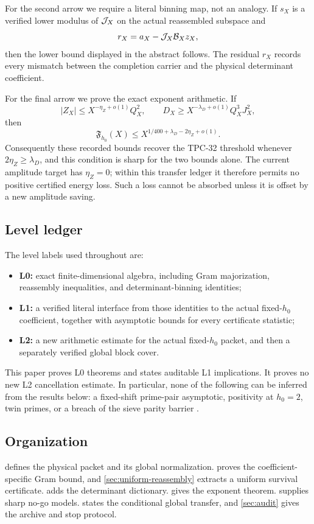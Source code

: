 For the second arrow we require a literal binning map, not an
analogy.  If \(s_X\) is a verified lower modulus of \(\mathcal J_X\) on the
actual reassembled subspace and
\[
 r_X=a_X-\mathcal J_X\mathcal B_Xz_X,
\]
then the lower bound displayed in the abstract follows.  The residual
\(r_X\) records every mismatch between the completion carrier and the
physical determinant coefficient.

For the final arrow we prove the exact exponent arithmetic.  If
\begin{equation}
 |Z_X|\le X^{-\eta_Z+o(1)}Q_X^2,
 \qquad
 D_X\ge X^{-\lambda_D+o(1)}Q_X^3J_X^2,
 \label{eq:intro-exponents}
\end{equation}
then
\begin{equation}
 \mathfrak F_{h_0}(X)
 \le
 X^{1/400+\lambda_D-2\eta_Z+o(1)}.
 \label{eq:intro-exponent-transfer}
\end{equation}
Consequently these recorded bounds recover the TPC-32 threshold
whenever \(2\eta_Z\ge\lambda_D\), and this condition is sharp for the
two bounds alone.  The current amplitude target has \(\eta_Z=0\);
within this transfer ledger it therefore permits no positive
certified energy loss.  Such a loss cannot be absorbed unless it is
offset by a new amplitude saving.

\subsection{Level ledger}

The level labels used throughout are:
\begin{itemize}[leftmargin=2em]
\item \textbf{L0:} exact finite-dimensional algebra, including Gram
majorization, reassembly inequalities, and determinant-binning
identities;
\item \textbf{L1:} a verified literal interface from those identities
to the actual fixed-\(h_0\) coefficient, together with asymptotic
bounds for every certificate statistic;
\item \textbf{L2:} a new arithmetic estimate for the actual
fixed-\(h_0\) packet, and then a separately verified global block
cover.
\end{itemize}
This paper proves L0 theorems and states auditable L1 implications.
It proves no new L2 cancellation estimate.  In particular, none of
the following can be inferred from the results below: a fixed-shift
prime-pair asymptotic, positivity at \(h_0=2\), twin primes, or a
breach of the sieve parity barrier \citep{HeathBrown1982Parity}.

\subsection{Organization}

 defines the physical packet and its global
normalization.   proves the
coefficient-specific Gram bound, and \cref{sec:uniform-reassembly}
extracts a uniform survival certificate.
 adds the determinant dictionary.
 gives the exponent theorem.
 supplies sharp no-go models.
 states the conditional global transfer, and
\cref{sec:audit} gives the archive and stop protocol.
